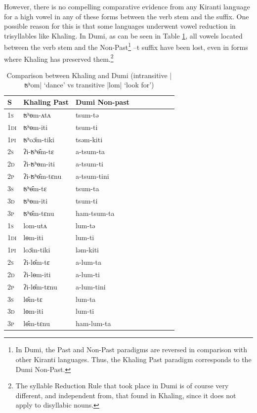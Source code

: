 \documentclass[oldfontcommands,oneside,a4paper,11pt]{article}
\newcommand{\ipa}[1]{{\phon \mbox{#1}}} %
\begin{document}
However, there is no compelling comparative evidence from any Kiranti language for a high vowel in any of these forms between the verb stem and the suffix. One possible reason for this is that some languages underwent vowel reduction in trisyllables like Khaling. In Dumi, as can be seen in Table \ref{tab:intrans.dumi}, all vowels located between the verb stem and the Non-Past\footnote{In Dumi, the Past and Non-Past paradigms are reversed in comparison with other Kiranti languages. Thus, the Khaling Past paradigm corresponds to the Dumi Non-Past.} \ipa{--t} suffix  have been lost, even in forms where Khaling has preserved them.\footnote{The syllable Reduction Rule that took place in Dumi is of course very different, and independent from, that found in Khaling, since it does not apply to disyllabic nouns.}

 
\begin{table}[h]
\caption{Comparison between Khaling and Dumi (intransitive |\ipa{ʦʰom}|	`dance' vs transitive |\ipa{lom}| `look for')} \label{tab:intrans.dumi} \centering
\begin{tabular}{lllllllll}
\toprule
S & Khaling Past & Dumi Non-past&  \\
\midrule
\textsc{1s} &   \ipa{ʦʰɵm-ʌtʌ} &  \ipa{tsum-tə} \\
\textsc{1di} &    \ipa{ʦʰɵm-iti}& \ipa{tsum-ti} \\
\textsc{1pi} &    \ipa{ʦʰoɔ̄m-tiki} &\ipa{tsəm-kiti}\\
\textsc{2s}   &\ipa{ʔi-ʦʰɵ̂m-tɛ}  & \ipa{a-tsum-ta} \\
\textsc{2d}   &\ipa{ʔi-ʦʰɵm-iti} &  \ipa{a-tsum-ti}\\
\textsc{2p}  & \ipa{ʔi-ʦʰɵ̂m-tɛnu} &  \ipa{a-tsum-tini} \\
\textsc{3s}  &\ipa{ʦʰɵ̂m-tɛ} & \ipa{tsum-ta}\\
\textsc{3d}   &\ipa{ʦʰɵm-iti} &\ipa{tsum-ti}\\
\textsc{3p}  & \ipa{ʦʰɵ̂m-tɛnu} &\ipa{ham-tsum-ta} \\
\midrule
\textsc{1s} &   \ipa{lom-utʌ} &  \ipa{lum-tə} &\\
\textsc{1di} &    \ipa{lɵm-iti}& \ipa{lum-ti}& \\
\textsc{1pi} &    \ipa{loɔ̄m-tiki} &\ipa{ləm-kiti}&\\
\textsc{2s}   &\ipa{ʔi-lɵ̂m-tɛ}  & \ipa{a-lum-ta}& \\
\textsc{2d}   &\ipa{ʔi-lɵm-iti} &  \ipa{a-lum-ti}&\\
\textsc{2p}  & \ipa{ʔi-lɵ̂m-tɛnu} &  \ipa{a-lum-tini} &\\
\textsc{3s}  &\ipa{lɵ̂m-tɛ} & \ipa{lum-ta}&\\
\textsc{3d}   &\ipa{lɵm-iti} &\ipa{lum-ti}&\\
\textsc{3p}  & \ipa{lɵ̂m-tɛnu} &\ipa{ham-lum-ta}& \\
\bottomrule
\end{tabular}
\end{table}
\end{document}
